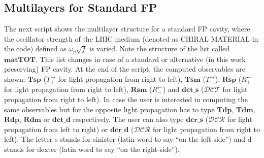 \documentclass[aps,prl,10pt,onecolumn,superscriptaddress]{revtex4-2}
\begin{document}
\subsection{Multilayers for Standard FP}
The next script shows the multilayer structure for a standard FP cavity, where the oscillator strength of the LHIC medium (denoted as CHIRAL MATERIAL in the code) defined as $\omega_{p}\sqrt{f}$ is varied. Note the structure of the list called $\mathbf{matTOT}$. This list changes in case of a standard or alternative (in this work preserving) FP cavity. At the end of the script, the computed observables are shown: $\mathbf{Tsp}$ ($T^{\rightarrow}_{+}$ for light propagation from right to left), $\mathbf{Tsm}$ ($T^{\rightarrow}_{-}$), $\mathbf{Rsp}$ ($R^{\leftarrow}_{+}$ for light propagation from right to left), $\mathbf{Rsm}$ ($R^{\leftarrow}_{-}$) and $\mathbf{dct\_s}$ ($\mathcal{DCT}$ for light propagation from right to left). In case the user is interested in computing the same observables but for the opposite light propagation has to type $\mathbf{Tdp}$, $\mathbf{Tdm}$, $\mathbf{Rdp}$, $\mathbf{Rdm}$ or $\mathbf{dct\_d}$ respectively. The user can also type $\mathbf{dcr\_s}$ ($\mathcal{DCR}$ for light propagation from left to right) or $\mathbf{dcr\_d}$ ($\mathcal{DCR}$ for light propagation from right to left). The letter s stands for sinister (latin word to say ``on the left-side'') and d stands for dexter (latin word to say ``on the right-side'').
\end{document}
